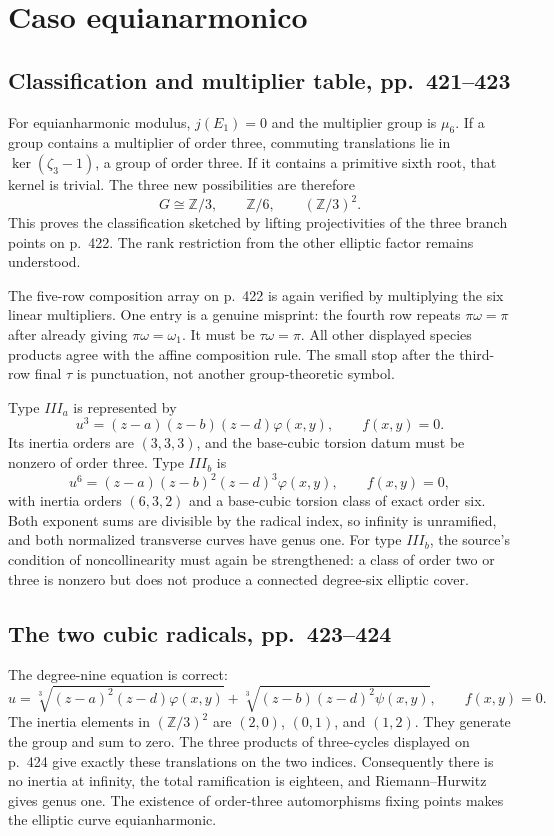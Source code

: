\section{Caso equianarmonico}
\label{cp2-x-18}

\subsection{Classification and multiplier table, pp.~421--423}

For equianharmonic modulus, $j(E_1)=0$ and the multiplier group is $\mu_6$. If a group contains a multiplier of order three, commuting translations lie in $\ker(\zeta_3-1)$, a group of order three. If it contains a primitive sixth root, that kernel is trivial. The three new possibilities are therefore
\[
 G\cong\mathbb Z/3,\qquad\mathbb Z/6,
 \qquad(\mathbb Z/3)^2.
\]
This proves the classification sketched by lifting projectivities of the three branch points on p.~422. The rank restriction from the other elliptic factor remains understood.

The five-row composition array on p.~422 is again verified by multiplying the six linear multipliers. One entry is a genuine misprint: the fourth row repeats $\pi\omega=\pi$ after already giving $\pi\omega=\omega_1$. It must be $\tau\omega=\pi$. All other displayed species products agree with the affine composition rule. The small stop after the third-row final $\tau$ is punctuation, not another group-theoretic symbol.

Type $III_a$ is represented by
\[
 u^3=(z-a)(z-b)(z-d)\varphi(x,y),\qquad f(x,y)=0.
\]
Its inertia orders are $(3,3,3)$, and the base-cubic torsion datum must be nonzero of order three. Type $III_b$ is
\[
 u^6=(z-a)(z-b)^2(z-d)^3\varphi(x,y),\qquad f(x,y)=0,
\]
with inertia orders $(6,3,2)$ and a base-cubic torsion class of exact order six. Both exponent sums are divisible by the radical index, so infinity is unramified, and both normalized transverse curves have genus one. For type $III_b$, the source's condition of noncollinearity must again be strengthened: a class of order two or three is nonzero but does not produce a connected degree-six elliptic cover.

\subsection{The two cubic radicals, pp.~423--424}

The degree-nine equation is correct:
\[
 u=\sqrt[3]{(z-a)^2(z-d)\varphi(x,y)}
   +\sqrt[3]{(z-b)(z-d)^2\psi(x,y)},
 \qquad f(x,y)=0.
\]
The inertia elements in $(\mathbb Z/3)^2$ are $(2,0)$, $(0,1)$, and $(1,2)$. They generate the group and sum to zero. The three products of three-cycles displayed on p.~424 give exactly these translations on the two indices. Consequently there is no inertia at infinity, the total ramification is eighteen, and Riemann--Hurwitz gives genus one. The existence of order-three automorphisms fixing points makes the elliptic curve equianharmonic.


